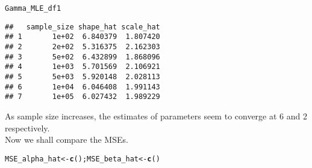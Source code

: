 \documentclass[11pt, a4paper]{article}\usepackage[]{graphicx}\usepackage[]{xcolor}
\makeatletter
\newcommand{\hldef}[1]{\textcolor[rgb]{0.345,0.345,0.345}{#1}}%
\newcommand{\hlkwb}[1]{\textcolor[rgb]{0.69,0.353,0.396}{#1}}%
\newcommand{\hlkwd}[1]{\textcolor[rgb]{0.737,0.353,0.396}{\textbf{#1}}}%
\newenvironment{kframe}{%
 \def\at@end@of@kframe{}%
 \ifinner\ifhmode%
  \def\at@end@of@kframe{\end{minipage}}%
  \begin{minipage}{\columnwidth}%
 \fi\fi%
 \def\FrameCommand##1{\hskip\@totalleftmargin \hskip-\fboxsep
 \colorbox{shadecolor}{##1}\hskip-\fboxsep
     \hskip-\linewidth \hskip-\@totalleftmargin \hskip\columnwidth}%
 \MakeFramed {\advance\hsize-\width
   \@totalleftmargin\z@ \linewidth\hsize
   \@setminipage}}%
 {\par\unskip\endMakeFramed%
 \at@end@of@kframe}
\newenvironment{knitrout}{}{} %
\makeatother
\begin{document}
\begin{knitrout}
\color{fgcolor}\begin{kframe}
\begin{alltt}
\hldef{Gamma_MLE_df1}
\end{alltt}
\begin{verbatim}
##   sample_size shape_hat scale_hat
## 1       1e+02  6.840379  1.807420
## 2       2e+02  5.316375  2.162303
## 3       5e+02  6.432899  1.868096
## 4       1e+03  5.701569  2.106921
## 5       5e+03  5.920148  2.028113
## 6       1e+04  6.046408  1.991143
## 7       1e+05  6.027432  1.989229
\end{verbatim}
\end{kframe}
\end{knitrout}

\smallpencil \hspace{0.1cm} {\setlength{\spaceskip}{1em plus 0.5em minus 0.5em} \fontsize{17}{20}\myfont As sample size increases, the estimates of parameters seem to converge at 6 and 2 respectively. \\

Now we shall compare the MSEs.
\par}




\begin{knitrout}
\color{fgcolor}\begin{kframe}
\begin{alltt}
\hldef{MSE_alpha_hat} \hlkwb{<-} \hlkwd{c}\hldef{(); MSE_beta_hat} \hlkwb{<-} \hlkwd{c}\hldef{()}
\end{alltt}
\end{kframe}
\end{knitrout}
\end{document}
